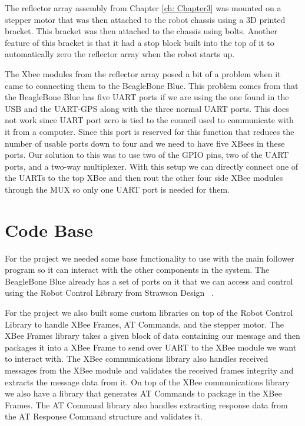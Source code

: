 \vspace*{12pt}
\noindent
The reflector array assembly from Chapter \ref{ch: Chapter3} was mounted on a stepper motor that was then attached to the robot chassis using a 3D printed bracket. This bracket was then attached to the chassis using bolts. Another feature of this bracket is that it had a stop block built into the top of it to automatically zero the reflector array when the robot starts up.

\vspace*{12pt}
\noindent
The Xbee modules from the reflector array posed a bit of a problem when it came to connecting them to the BeagleBone Blue. This problem comes from that the BeagleBone Blue has five UART ports if we are using the one found in the USB and the UART-GPS along with the three normal UART ports. This does not work since UART port zero is tied to the council used to communicate with it from a computer. Since this port is reserved for this function that reduces the number of usable ports down to four and we need to have five XBees in these ports. Our solution to this was to use two of the GPIO pins, two of the UART ports, and a two-way multiplexer. With this setup we can directly connect one of the UARTs to the top XBee and then rout the other four side XBee modules through the MUX so only one UART port is needed for them.


\section{Code Base}
\label{sec:Code Base}

For the project we needed some base functionality to use with the main follower program so it can interact with the other components in the system. The BeagleBone Blue already has a set of ports on it that we can access and control using the Robot Control Library from Strawson Design ~\cite{Robot_Control_Library}.

\vspace*{12pt}
\noindent
For the project we also built some custom libraries on top of the Robot Control Library to handle XBee Frames, AT Commands, and the stepper motor. The XBee Frames library takes a given block of data containing our message and then packages it into a XBee Frame to send over UART to the XBee module we want to interact with. The XBee communications library also handles received messages from the XBee module and validates the received frames integrity and extracts the message data from it. On top of the XBee communications library we also have a library that generates AT Commands to package in the XBee Frames. The AT Command library also handles extracting response data from the AT Response Command structure and validates it.

